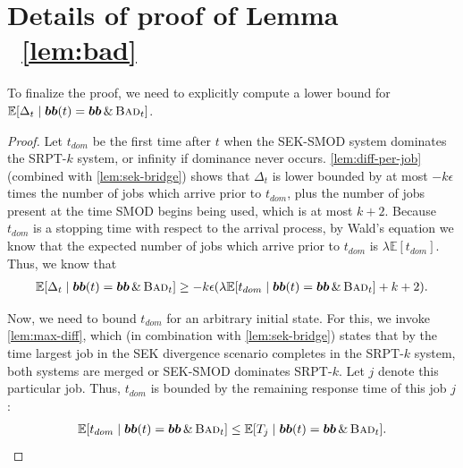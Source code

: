 \documentclass[acmsmall]{acmart}
\newcommand{\E}[1]{\mathbb{E}[#1]}
\newcommand{\bb}{\boldsymbol{b}}
\newcommand{\bbb}{\bb\bb}
\newcommand{\bad}{\textsc{Bad}}
\begin{document}
\section[Details of Proof of Lemma ~\ref{lem:bad}]{Details of proof of Lemma ~\ref{lem:bad}}
\label{ap:proof-bad}

To finalize the proof, we need to explicitly compute a lower bound for $\E{\Delta_t \mid\bbb(t) = \bbb \,\&\, \bad_t}$. 

\begin{proof}
    Let $t_{dom}$ be the first time after $t$ when the SEK-SMOD system dominates the SRPT-$k$ system, or infinity if dominance never occurs.
    \cref{lem:diff-per-job} (combined with \cref{lem:sek-bridge}) shows that $\Delta_t$ is lower bounded by at most $-k \epsilon$ times the number of jobs which arrive prior to $t_{dom}$,
    plus the number of jobs present at the time SMOD begins being used,
    which is at most $k+2$.
    Because $t_{dom}$ is a stopping time with respect to the arrival process,
    by Wald's equation we know that the expected number of jobs which arrive prior to $t_{dom}$ is $\lambda \E{t_{dom}}$.
    Thus, we know that
    \begin{align}
        \label{eq:delta-by-dom}
        \E{\Delta_t \mid\bbb(t) = \bbb \,\&\, \bad_t} \ge - k \epsilon (\lambda \E{t_{dom} \mid\bbb(t) = \bbb \,\&\, \bad_t} + k+2).
    \end{align}

    Now, we need to bound $t_{dom}$ for an arbitrary initial state. For this, we invoke \cref{lem:max-diff},
    which (in combination with \cref{lem:sek-bridge}) states that by the time largest job in the SEK divergence scenario completes in the SRPT-$k$ system,
    both systems are merged or SEK-SMOD dominates SRPT-$k$.
    Let $j$ denote this particular job. Thus, $t_{dom}$ is bounded by the remaining response time of this job $j$:
    \begin{align}
        \label{eq:dom-by-response}
        \E{t_{dom} \mid\bbb(t) = \bbb \,\&\, \bad_t} \le \E{T_j \mid\bbb(t) = \bbb \,\&\, \bad_t}.
    \end{align}
    

\end{proof}
\end{document}

